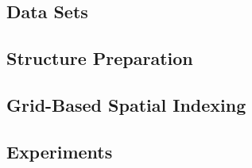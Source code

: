 \subsection*{Data Sets}
\label{subsec:data_sets}

\subsection*{Structure Preparation}
\label{subsec:structure_preparation}

\subsection*{Grid-Based Spatial Indexing}
\label{subsec:grid_based_indexing}

\subsection*{Experiments}
\label{subsec:experiments}

